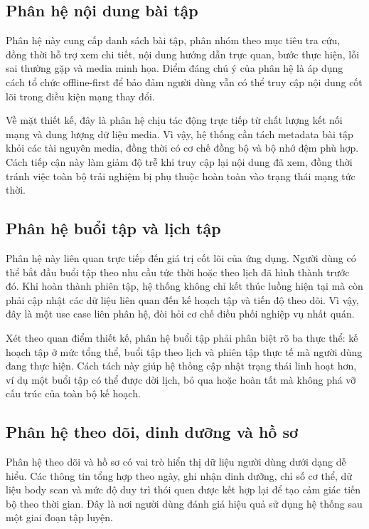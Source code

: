 \subsection{Phân hệ nội dung bài tập}

Phân hệ này cung cấp danh sách bài tập, phân nhóm theo mục tiêu tra cứu, đồng thời hỗ trợ xem chi tiết, nội dung hướng dẫn trực quan, bước thực hiện, lỗi sai thường gặp và media minh họa. Điểm đáng chú ý của phân hệ là áp dụng cách tổ chức offline-first để bảo đảm người dùng vẫn có thể truy cập nội dung cốt lõi trong điều kiện mạng thay đổi.

Về mặt thiết kế, đây là phân hệ chịu tác động trực tiếp từ chất lượng kết nối mạng và dung lượng dữ liệu media. Vì vậy, hệ thống cần tách metadata bài tập khỏi các tài nguyên media, đồng thời có cơ chế đồng bộ và bộ nhớ đệm phù hợp. Cách tiếp cận này làm giảm độ trễ khi truy cập lại nội dung đã xem, đồng thời tránh việc toàn bộ trải nghiệm bị phụ thuộc hoàn toàn vào trạng thái mạng tức thời.

\subsection{Phân hệ buổi tập và lịch tập}

Phân hệ này liên quan trực tiếp đến giá trị cốt lõi của ứng dụng. Người dùng có thể bắt đầu buổi tập theo nhu cầu tức thời hoặc theo lịch đã hình thành trước đó. Khi hoàn thành phiên tập, hệ thống không chỉ kết thúc luồng hiện tại mà còn phải cập nhật các dữ liệu liên quan đến kế hoạch tập và tiến độ theo dõi. Vì vậy, đây là một use case liên phân hệ, đòi hỏi cơ chế điều phối nghiệp vụ nhất quán.

Xét theo quan điểm thiết kế, phân hệ buổi tập phải phân biệt rõ ba thực thể: kế hoạch tập ở mức tổng thể, buổi tập theo lịch và phiên tập thực tế mà người dùng đang thực hiện. Cách tách này giúp hệ thống cập nhật trạng thái linh hoạt hơn, ví dụ một buổi tập có thể được dời lịch, bỏ qua hoặc hoàn tất mà không phá vỡ cấu trúc của toàn bộ kế hoạch.

\subsection{Phân hệ theo dõi, dinh dưỡng và hồ sơ}

Phân hệ theo dõi và hồ sơ có vai trò hiển thị dữ liệu người dùng dưới dạng dễ hiểu. Các thông tin tổng hợp theo ngày, ghi nhận dinh dưỡng, chỉ số cơ thể, dữ liệu body scan và mức độ duy trì thói quen được kết hợp lại để tạo cảm giác tiến bộ theo thời gian. Đây là nơi người dùng đánh giá hiệu quả sử dụng hệ thống sau một giai đoạn tập luyện.

